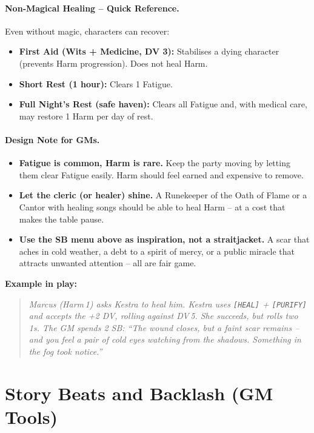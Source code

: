 \paragraph{Non‑Magical Healing – Quick Reference.}
Even without magic, characters can recover:
\begin{itemize}
  \item \textbf{First Aid (Wits + Medicine, DV 3):} Stabilises a dying character (prevents Harm progression).  Does not heal Harm.
  \item \textbf{Short Rest (1 hour):} Clears 1 Fatigue.
  \item \textbf{Full Night’s Rest (safe haven):} Clears all Fatigue and, with medical care, may restore 1 Harm per day of rest.
\end{itemize}

\paragraph{Design Note for GMs.}
\begin{itemize}
  \item \textbf{Fatigue is common, Harm is rare.}  Keep the party moving by letting them clear Fatigue easily.  Harm should feel earned and expensive to remove.
  \item \textbf{Let the cleric (or healer) shine.}  A Runekeeper of the Oath of Flame or a Cantor with healing songs should be able to heal Harm – at a cost that makes the table pause.
  \item \textbf{Use the SB menu above as inspiration, not a straitjacket.}  A scar that aches in cold weather, a debt to a spirit of mercy, or a public miracle that attracts unwanted attention – all are fair game.
\end{itemize}

\noindent\textbf{Example in play:}
\begin{quote}
  \emph{Marcus (Harm 1) asks Kestra to heal him.  Kestra uses \texttt{[HEAL]} + \texttt{[PURIFY]} and accepts the +2 DV, rolling against DV 5.  She succeeds, but rolls two 1s.  The GM spends 2 SB: “The wound closes, but a faint scar remains – and you feel a pair of cold eyes watching from the shadows.  Something in the fog took notice.”}
\end{quote}

\section{Story Beats and Backlash (GM Tools)}
\label{sec:story-beats-backlash}

